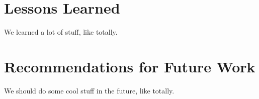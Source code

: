 \documentclass{report}
\begin{document}
\section{Lessons Learned}
We learned a lot of stuff, like totally.

\section{Recommendations for Future Work}
We should do some cool stuff in the future, like totally. 
\end{document}
